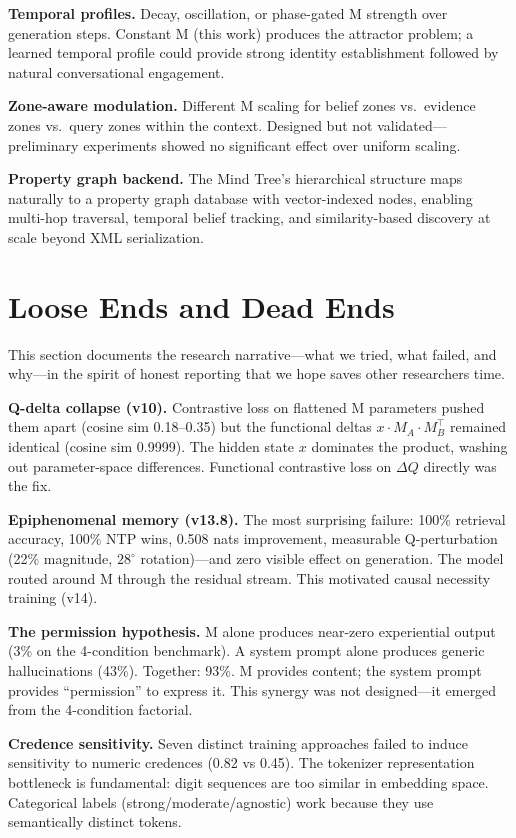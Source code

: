 \textbf{Temporal profiles.} Decay, oscillation, or phase-gated M strength over generation steps. Constant M (this work) produces the attractor problem; a learned temporal profile could provide strong identity establishment followed by natural conversational engagement.

\textbf{Zone-aware modulation.} Different M scaling for belief zones vs.\ evidence zones vs.\ query zones within the context. Designed but not validated---preliminary experiments showed no significant effect over uniform scaling.

\textbf{Property graph backend.} The Mind Tree's hierarchical structure maps naturally to a property graph database with vector-indexed nodes, enabling multi-hop traversal, temporal belief tracking, and similarity-based discovery at scale beyond XML serialization.

\section{Loose Ends and Dead Ends}
\label{sec:loose_ends}

This section documents the research narrative---what we tried, what failed, and why---in the spirit of honest reporting that we hope saves other researchers time.

\textbf{Q-delta collapse (v10).} Contrastive loss on flattened M parameters pushed them apart (cosine sim 0.18--0.35) but the functional deltas $x \cdot M_A \cdot M_B^\top$ remained identical (cosine sim 0.9999). The hidden state $x$ dominates the product, washing out parameter-space differences. Functional contrastive loss on $\Delta Q$ directly was the fix.

\textbf{Epiphenomenal memory (v13.8).} The most surprising failure: 100\% retrieval accuracy, 100\% NTP wins, 0.508 nats improvement, measurable Q-perturbation (22\% magnitude, $28^\circ$ rotation)---and zero visible effect on generation. The model routed around M through the residual stream. This motivated causal necessity training (v14).

\textbf{The permission hypothesis.} M alone produces near-zero experiential output (3\% on the 4-condition benchmark). A system prompt alone produces generic hallucinations (43\%). Together: 93\%. M provides content; the system prompt provides ``permission'' to express it. This synergy was not designed---it emerged from the 4-condition factorial.

\textbf{Credence sensitivity.} Seven distinct training approaches failed to induce sensitivity to numeric credences (0.82 vs 0.45). The tokenizer representation bottleneck is fundamental: digit sequences are too similar in embedding space. Categorical labels (strong/moderate/agnostic) work because they use semantically distinct tokens.

